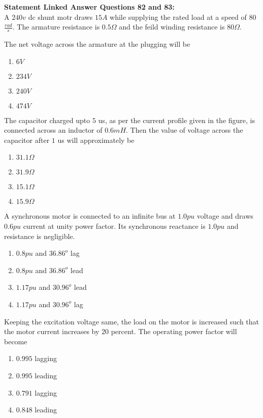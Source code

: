  \textbf{Statement Linked Answer Questions 82 and 83:}\\
A $240 v$ dc shunt motr draws $15 A$ while supplying the rated load at a speed of $80$ $\frac{rad}{s}$. The armature resistance is $0.5 \Omega$ and the feild winding resistance is $80 \Omega$.\\
\item The net voltage across the armature at the plugging will be 
\begin{enumerate}
    \item $6 V$ 
    \item $234 V$
    \item $240 V$
    \item $474 V$
\end{enumerate}
\item The capacitor charged upto $5$ us, as per the current profile given in the figure, is connected across an inductor of $0.6 mH$. Then the value of voltage across the capacitor after $1$ us will approximately be
\begin{enumerate}
    \item $31.1\Omega$
    \item $31.9\Omega$
    \item $15.1\Omega$
    \item $15.9\Omega$
\end{enumerate}
\item A synchronous motor is connected to an infinite bus at $1.0 pu$ voltage and draws $0.6 pu$ current at unity power factor. Its synchronous reactance is $1.0 pu$ and resistance is negligible.
\begin{enumerate}
    \item $0.8 pu$ and $36.86^o$ lag
    \item $0.8 pu$ and $36.86^o$ lead
    \item $1.17 pu$ and $30.96^o$ lead
    \item $1.17 pu$ and $30.96^o$ lag
\end{enumerate}
\item Keeping the excitation voltage same, the load on the motor is increased such that the motor current increases by $20$ percent. The operating power factor will become
\begin{enumerate}
    \item $0.995$ lagging 
    \item $0.995$ leading
    \item $0.791$ lagging
    \item $0.848$ leading
\end{enumerate}
 
